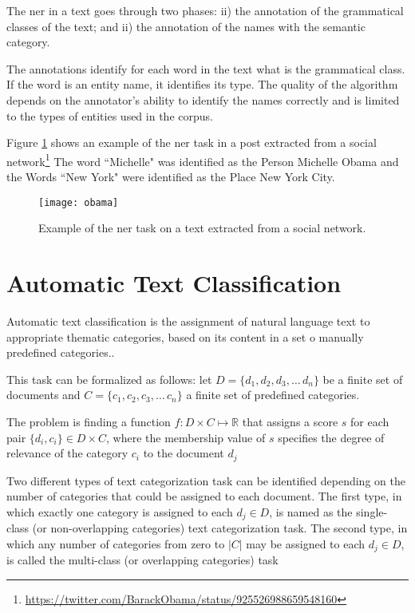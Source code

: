 The \gls{ner} in a text goes through two phases: ii) the annotation of the grammatical classes of the text; and ii) the annotation of the names with the semantic category.

The annotations identify for each word in the text what is the grammatical class. If the word is an entity name, it identifies its type.
The quality of the algorithm depends on the annotator's ability to identify the names correctly and is limited to the types of entities used in the corpus. 

Figure \ref{fig:obama-example} shows an example of the \gls{ner} task in a post extracted from a social network\footnote{\url{https://twitter.com/BarackObama/status/925526988659548160}}  The word ``Michelle" was identified as the Person Michelle Obama and the Words ``New York" were identified as the Place New York City. 

 
\begin{figure}[H]
  \texttt{[image: obama]}
  \caption{Example of the \gls{ner} task on a text extracted from a social network.}
  \label{fig:obama-example}
\end{figure}


\section{\hspace*{3pt}Automatic Text Classification}



Automatic text classification is the assignment of natural language text to appropriate thematic categories, based on its content in a set o manually predefined categories.\cite{yang1999evaluation}. 

This task can be formalized as follows: let $D = \{d_1,d_2,d_3,\ldots\,d_n\}$ be a finite set of documents and $C = \{c_1,c_2,c_3,\ldots\,c_n\}$ a finite set of predefined categories.

The problem is finding a function $f: D \times C \mapsto \mathbb{R}$ that assigns a score $s$ for each pair 
$\{d_i, c_i\} \in  D \times C $, where the membership value of  $s$ specifies the degree of relevance of the category $c_i$ to the document $d_j$

Two different types of text categorization task can be identified depending on
the number of categories that could be assigned to each document. The first
type, in which exactly one category is assigned to each $d_j \in D$, is named  as the single-class (or non-overlapping categories) text categorization task.
The second type, in which any number of categories from zero to $|C|$ may be
assigned to each $d_j \in D$, is called the multi-class (or overlapping categories) task



